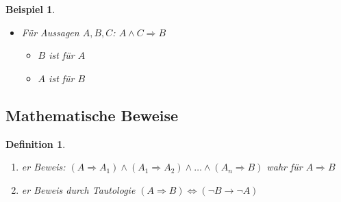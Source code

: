 \documentclass[ngerman,a4paper]{report}
\theoremstyle{break}
\newtheorem{example}[theorem]{Beispiel}
\newtheorem*{definition}{Definition}
\newcommand{\highlight}[1]{\emph{#1}}
\begin{document}
\begin{example}
	\begin{itemize}
		\item Für Aussagen $A,B,C$: $A\land C \Rightarrow B$
		\begin{itemize}
			\item $B$ ist  für $A$
			\item $A$ ist  für $B$
		\end{itemize}
	\end{itemize}
\end{example}

\subsection*{Mathematische Beweise}
\begin{definition}
	\begin{enumerate}
		\item {}\highlight{er Beweis}: $(A\Rightarrow A_1)\land(A_1\Rightarrow A_2)\land\dotsc\land(A_n\Rightarrow B)$ wahr für $A\Rightarrow B$
		\item {}\highlight{er Beweis} durch Tautologie $(A\Rightarrow B)\Leftrightarrow (\neg B\rightarrow \neg A)$
	\end{enumerate}
\end{definition}
\end{document}
